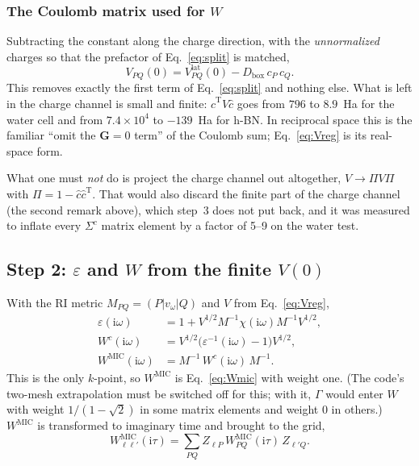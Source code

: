 \documentclass[%
 reprint,
superscriptaddress,
 amsmath,amssymb,
 aps,
prb,
]{revtex4-2}
\newcommand{\bG}{\mathbf{G}}
\newcommand{\ii}{\mathrm{i}}
\newcommand{\MIC}{\mathrm{MIC}}
\newcommand{\Tr}{\mathrm{T}}
\newcommand{\lat}{\mathrm{lat}}
\begin{document}
\subsubsection{The Coulomb matrix used for $W$}

Subtracting the constant along the charge direction, with the \emph{unnormalized} charges so
that the prefactor of Eq.~\eqref{eq:split} is matched,
\begin{equation}
  V_{PQ}(0) = V^\lat_{PQ}(0) - D_\mathrm{box}\, c_P\, c_Q .
  \label{eq:Vreg}
\end{equation}
This removes exactly the first term of Eq.~\eqref{eq:split} and nothing else. What is left in
the charge channel is small and finite: $\hat c^\Tr V\hat c$ goes from $796$ to $8.9$~Ha for the
water cell and from $7.4\times10^{4}$ to $-139$~Ha for h-BN. In reciprocal space this is the
familiar ``omit the $\bG=0$ term'' of the Coulomb sum; Eq.~\eqref{eq:Vreg} is its real-space
form.

What one must \emph{not} do is project the charge channel out altogether,
$V\to\Pi V\Pi$ with $\Pi = 1-\hat c\hat c^\Tr$. That would also discard the finite part of the
charge channel (the second remark above), which step~3 does not put back, and it was measured
to inflate every $\Sigma^c$ matrix element by a factor of 5--9 on the water test.

\subsection{Step 2: $\varepsilon$ and $W$ from the finite $V(0)$}
\label{sec:step2}
\label{sec:W}

With the RI metric $M_{PQ} = (P|v_\omega|Q)$ and $V$ from Eq.~\eqref{eq:Vreg},
\begin{align}
  \varepsilon(\ii\omega) &= 1 + V^{1/2} M^{-1}\chi(\ii\omega) M^{-1} V^{1/2},
  \label{eq:eps}\\
  W^c(\ii\omega) &= V^{1/2}\big(\varepsilon^{-1}(\ii\omega) - 1\big)V^{1/2},
  \label{eq:Wc}\\
  W^{\MIC}(\ii\omega) &= M^{-1}\, W^c(\ii\omega)\, M^{-1}.
  \label{eq:Wmic}
\end{align}
This is the only $k$-point, so $W^\MIC$ is Eq.~\eqref{eq:Wmic} with weight one. (The code's
two-mesh extrapolation must be switched off for this; with it, $\Gamma$ would enter $W$ with
weight $1/(1-\sqrt2)$ in some matrix elements and weight 0 in others.) $W^\MIC$ is transformed
to imaginary time and brought to the grid,
\begin{equation}
  W^{\MIC}_{\ell\ell'}(\ii\tau) = \sum_{PQ} Z_{\ell P}\, W^{\MIC}_{PQ}(\ii\tau)\, Z_{\ell'Q}.
  \label{eq:W_grid}
\end{equation}
\end{document}
